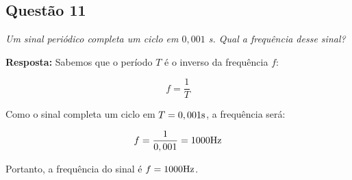 \subsection*{Questão 11}

\textit{Um sinal periódico completa um ciclo em $0,001$ s. Qual a frequência desse sinal?}

\textbf{Resposta:}
Sabemos que o período $T$ é o inverso da frequência $f$:

\begin{equation}
    f = \frac{1}{T}
\end{equation}

Como o sinal completa um ciclo em $T = 0,001 \text{s}$, a frequência será:

\begin{equation}
    f = \frac{1}{0,001} = 1000 \text{Hz}
\end{equation}

Portanto, a frequência do sinal é $f = 1000 \text{Hz}$.